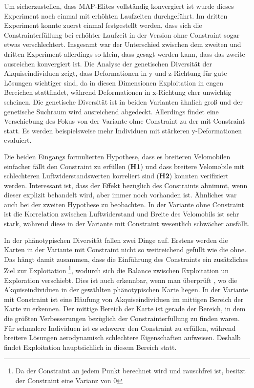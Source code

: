 Um sicherzustellen, dass MAP-Elites vollständig konvergiert ist wurde dieses Experiment noch einmal mit erhöhten Laufzeiten durchgeführt.
Im dritten Experiment konnte zuerst einmal festgestellt werden, dass sich die Constrainterfüllung bei erhöhter Laufzeit in der Version ohne Constraint sogar etwas verschlechtert.
Insgesamt war der Unterschied zwischen dem zweiten und dritten Experiment allerdings so klein, dass gesagt werden kann, dass das zweite ausreichen konvergiert ist.
Die Analyse der genetischen Diversität der Akquiseindividuen zeigt, dass Deformationen in y und z-Richtung für gute Lösungen wichtiger sind, da in diesen Dimensionen Exploitation in engen Bereichen stattfindet, während Deformationen in x-Richtung eher unwichtig scheinen.
Die genetische Diversität ist in beiden Varianten ähnlich groß und der genetische Suchraum wird ausreichend abgedeckt.
Allerdings findet eine Verschiebung des Fokus von der Variante ohne Constraint zu der mit Constraint statt.
Es werden beispielsweise mehr Individuen mit stärkeren y-Deformationen evaluiert.

Die beiden Eingangs formulierten Hypothese, dass es breiteren Velomobilen einfacher fällt den Constraint zu erfüllen (\textbf{H1}) und dass breitere Velomobile mit schlechteren Luftwiderstandswerten korreliert sind (\textbf{H2}) konnten verifiziert werden.
Interessant ist, dass der Effekt bezüglich des Constraints abnimmt, wenn dieser explizit behandelt wird, aber immer noch vorhanden ist.
Ähnliches war auch bei der zweiten Hypothese zu beobachten.
In der Variante ohne Constraint ist die Korrelation zwischen Luftwiderstand und Breite des Velomobils ist sehr stark, während diese in der Variante mit Constraint wesentlich schwächer ausfällt.

In der phänotypischen Diversität fallen zwei Dinge auf.
Erstens werden die Karten in der Variante mit Constraint nicht so weitreichend gefüllt wie die ohne.
Das hängt damit zusammen, dass die Einführung des Constraints ein zusätzliches Ziel zur Exploitation
\footnote{Da der Constraint an jedem Punkt berechnet wird und rauschfrei ist, besitzt der Constraint eine Varianz von 0}, wodurch sich die Balance zwischen Exploitation un Exploration verschiebt.
Dies ist auch erkennbar, wenn man überprüft , wo die Akquiseindividuen in der gewählten phänotypischen Karte liegen.
In der Variante mit Constraint ist eine Häufung von Akquiseindividuen im mittigen Bereich der Karte zu erkennen.
Der mittige Bereich der Karte ist gerade der Bereich, in dem die größten Verbesserungen bezüglich der Constrainterfüllung zu finden waren.
Für schmalere Individuen ist es schwerer den Constraint zu erfüllen, während breitere Lösungen aerodynamisch schlechtere Eigenschaften aufweisen.
Deshalb findet Exploitation hauptsächlich in diesem Bereich statt.

